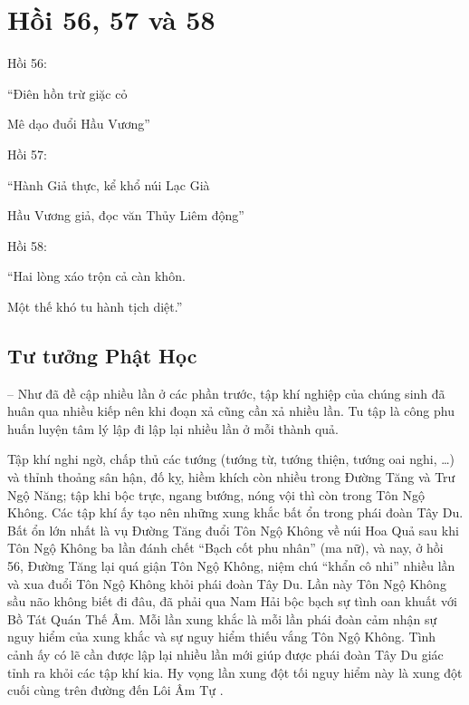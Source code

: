 \chapter{Hồi 56, 57 và 58} %
\label{cha:hoi_56_57}

Hồi 56:

\begin{itshape}
``Điên hồn trừ giặc cỏ

Mê dạo đuổi Hầu Vương''
\end{itshape}

Hồi 57:

\begin{itshape}
``Hành Giả thực, kể khổ núi Lạc Già

Hầu Vương giả, đọc văn Thủy Liêm động''
\end{itshape}

Hồi 58:

\begin{itshape}
``Hai lòng xáo trộn cả càn khôn.

Một thế khó tu hành tịch diệt.''
\end{itshape}

\section{Tư tưởng Phật Học} %
\label{sec:56_57_phat_hoc}

-- Như đã đề cập nhiều lần ở các phần trước, tập khí nghiệp của chúng sinh đã huân qua nhiều kiếp nên khi đoạn xả cũng cần xả nhiều lần. Tu tập là công phu huấn luyện tâm lý lập đi lập lại nhiều lần ở mỗi thành quả.

Tập khí nghi ngờ, chấp thủ các tướng (tướng từ, tướng thiện, tướng oai nghi, \ldots) và thỉnh thoảng sân hận, đố kỵ, hiềm khích còn nhiều trong Đường Tăng và Trư Ngộ Năng; tập khi bộc trực, ngang bướng, nóng vội thì còn trong Tôn Ngộ Không. Các tập khí ấy tạo nên những xung khắc bất ổn trong phái đoàn Tây Du. Bất ổn lớn nhất là vụ Đường Tăng đuổi Tôn Ngộ Không về núi Hoa Quả sau khi Tôn Ngộ Không ba lần đánh chết ``Bạch cốt phu nhân'' (ma nữ), và nay, ở hồi 56, Đường Tăng lại quá giận Tôn Ngộ Không, niệm chú ``khẩn cô nhi'' nhiều lần và xua đuổi Tôn Ngộ Không khỏi phái đoàn Tây Du. Lần này Tôn Ngộ Không sầu não không biết đi đâu, đã phải qua Nam Hải bộc bạch sự tình oan khuất với Bồ Tát Quán Thế Âm. Mỗi lần xung khắc là mỗi lần phái đoàn cảm nhận sự nguy hiểm của xung khắc và sự nguy hiểm thiếu vắng Tôn Ngộ Không. Tình cảnh ấy có lẽ cần được lập lại nhiều lần mới giúp được phái đoàn Tây Du giác tỉnh ra khỏi các tập khí kia. Hy vọng lần xung đột tối nguy hiểm này là xung đột cuối cùng trên đường đến Lôi Âm Tự .

